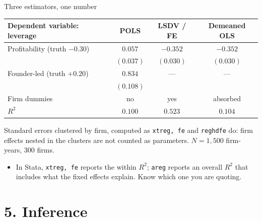 \documentclass[
  11pt,
  ignorenonframetext,
  aspectratio=169,
]{beamer}
\providecommand{\tightlist}{%
  \setlength{\itemsep}{0pt}\setlength{\parskip}{0pt}}
\begin{document}
\begin{frame}[fragile]{Three estimators, one number}
\protect{}\label{three-estimators-one-number}
\begin{center}\small
\begin{tabular}{lccc}
\toprule
Dependent variable: leverage & POLS & LSDV / FE & Demeaned OLS \\
\midrule
Profitability \quad(truth $-0.30$) & $0.057$ & $-0.352$ & $-0.352$ \\
 & $(0.037)$ & $(0.030)$ & $(0.030)$ \\
Founder-led \quad(truth $+0.20$) & $0.834$ & --- & --- \\
 & $(0.108)$ & & \\
\midrule
Firm dummies & no & yes & absorbed \\
$R^2$ & $0.100$ & $0.523$ & $0.104$ \\
\bottomrule
\end{tabular}
\end{center}

\vspace{0.2em}
\scriptsize

Standard errors clustered by firm, computed as \texttt{xtreg, fe} and
\texttt{reghdfe} do: firm effects nested in the clusters are not counted
as parameters. \(N = 1{,}500\) firm-years, \(300\) firms. \normalsize

\begin{itemize}
\tightlist
\item
  In Stata, \texttt{xtreg,\ fe} reports the within \(R^2\);
  \texttt{areg} reports an overall \(R^2\) that includes what the fixed
  effects explain. Know which one you are quoting.
\end{itemize}
\end{frame}

\section{5. Inference}\label{inference}
\end{document}
